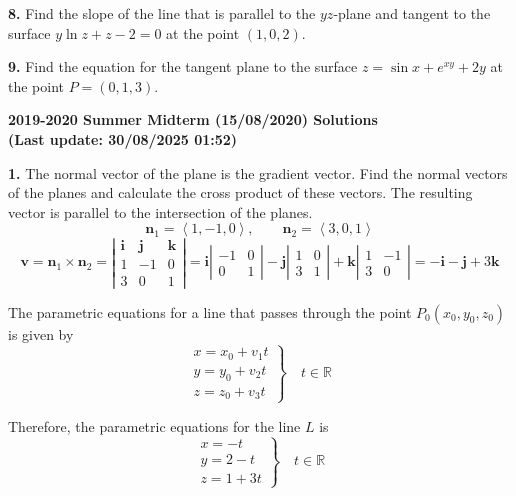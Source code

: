 \documentclass{article}
\begin{document}
\vspace{1em}

\textbf{8.} Find the slope of the line that is parallel to the $yz$-plane and tangent to the surface $y\ln z+z-2=0$ at the point $(1,0,2)$.

\vspace{1em}

\textbf{9.} Find the equation for the tangent plane to the surface $z=\sin x+{e}^{xy}+2y$ at the point $P=(0,1,3)$.

\newpage

\begin{center}
\textbf{2019-2020 Summer Midterm (15/08/2020) Solutions\\
(Last update: 30/08/2025 01:52)}
\end{center}

\textbf{1.} The normal vector of the plane is the gradient vector. Find the normal vectors of the planes and calculate the cross product of these vectors. The resulting vector is parallel to the intersection of the planes.
\[\mathbf{n}_1=\left\langle1,-1,0\right\rangle,\qquad \mathbf{n}_2=\left\langle3,0,1\right\rangle\]
\[\mathbf{v}=\mathbf{n}_1\times\mathbf{n}_2=\left|\begin{array}{ccc}
\mathbf{i}&\mathbf{j}&\mathbf{k}\\
1&-1&0\\
3&0&1
\end{array}\right|=\mathbf{i}\left|\begin{array}{cc}
-1&0\\0&1
\end{array}\right|-\mathbf{j}\left|\begin{array}{cc}
1&0\\3&1
\end{array}\right|+\mathbf{k}\left|\begin{array}{cc}
1&-1\\3&0
\end{array}\right|=-\mathbf{i}-\mathbf{j}+3\mathbf{k}\]

The parametric equations for a line that passes through the point $P_0(x_0,y_0,z_0)$ is given by
\[\left.\begin{array}{c}
x=x_0+v_1t\\
y=y_0+v_2t\\
z=z_0+v_3t
\end{array}\right\}\quad t\in\mathbb{R}\]

Therefore, the parametric equations for the line $L$ is
\[\boxed{\left.\begin{array}{l}
x=-t\\
y=2-t\\
z=1+3t
\end{array}\right\}\quad t\in\mathbb{R}}\]
\end{document}
